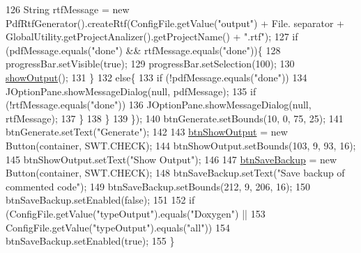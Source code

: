 \begin{DoxyCode}
126                 String rtfMessage = \textcolor{keyword}{new} PdfRtfGenerator().createRtf(ConfigFile.getValue(\textcolor{stringliteral}{"output"}) + File.
      separator + GlobalUtility.getProjectAnalizer().getProjectName() + \textcolor{stringliteral}{".rtf"});
127                 \textcolor{keywordflow}{if} (pdfMessage.equals(\textcolor{stringliteral}{"done"}) && rtfMessage.equals(\textcolor{stringliteral}{"done"}))\{
128                     progressBar.setVisible(\textcolor{keyword}{true});
129                     progressBar.setSelection(100);
130                     \hyperlink{classit_1_1isislab_1_1masonassisteddocumentation_1_1mason_1_1wizards_1_1_q___end_wizard_a4564b1098ec942795cbd022ccbe338e0}{showOutput}();
131                 \}
132                 \textcolor{keywordflow}{else}\{
133                     \textcolor{keywordflow}{if} (!pdfMessage.equals(\textcolor{stringliteral}{"done"}))
134                         JOptionPane.showMessageDialog(null, pdfMessage);
135                     \textcolor{keywordflow}{if} (!rtfMessage.equals(\textcolor{stringliteral}{"done"}))
136                         JOptionPane.showMessageDialog(null, rtfMessage);
137                 \}
138             \}
139         \});
140         btnGenerate.setBounds(10, 0, 75, 25);
141         btnGenerate.setText(\textcolor{stringliteral}{"Generate"});
142         
143         \hyperlink{classit_1_1isislab_1_1masonassisteddocumentation_1_1mason_1_1wizards_1_1_q___end_wizard_ae2da7cbfbfd8b618427f5d7fa356a8a5}{btnShowOutput} = \textcolor{keyword}{new} Button(container, SWT.CHECK);
144         btnShowOutput.setBounds(103, 9, 93, 16);
145         btnShowOutput.setText(\textcolor{stringliteral}{"Show Output"});
146         
147         \hyperlink{classit_1_1isislab_1_1masonassisteddocumentation_1_1mason_1_1wizards_1_1_q___end_wizard_a94ab1b59917837c6b2708a44f2d5e2c7}{btnSaveBackup} = \textcolor{keyword}{new} Button(container, SWT.CHECK);
148         btnSaveBackup.setText(\textcolor{stringliteral}{"Save backup of commented code"});
149         btnSaveBackup.setBounds(212, 9, 206, 16);
150         btnSaveBackup.setEnabled(\textcolor{keyword}{false});
151         
152         \textcolor{keywordflow}{if} (ConfigFile.getValue(\textcolor{stringliteral}{"typeOutput"}).equals(\textcolor{stringliteral}{"Doxygen"}) ||
153                 ConfigFile.getValue(\textcolor{stringliteral}{"typeOutput"}).equals(\textcolor{stringliteral}{"all"}))
154             btnSaveBackup.setEnabled(\textcolor{keyword}{true});
155     \}
\end{DoxyCode}


